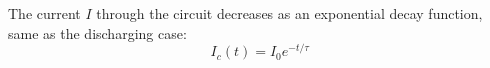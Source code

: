The current $I$ through the circuit decreases as an exponential decay function,
same as the discharging case:
\begin{equation}
    \boxed{I_c(t)=I_0e^{-t/\tau}}
\end{equation}


